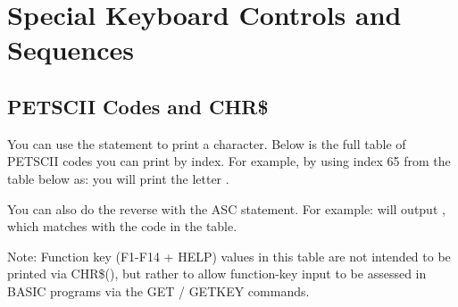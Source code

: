 \chapter{Special Keyboard Controls and Sequences}


\section{PETSCII Codes and CHR\$}

\label{appendix:asciicodes}

You can use the  statement to print a character.
Below is the full table of PETSCII codes you can print by index.  For example, by
using index 65 from the table below as:  you will
print the letter .

You can also do the reverse with the ASC statement.  For example:
 will output , which matches with the
code in the table.

Note: Function key (F1-F14 + HELP) values in this table are not intended to be printed via CHR\$(), but rather to allow function-key input to be assessed in BASIC programs via the GET / GETKEY commands.

